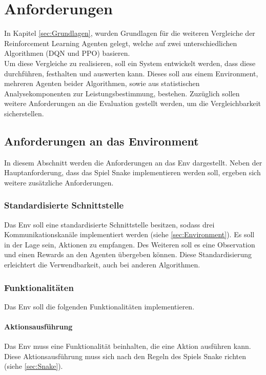 \chapter{Anforderungen} \label{chap:Anforderungen}
In Kapitel \ref{sec:Grundlagen}, wurden Grundlagen für die weiteren Vergleiche der Reinforcement Learning Agenten gelegt, welche auf zwei unterschiedlichen Algorithmen (DQN und PPO) basieren.\\
Um diese Vergleiche zu realisieren, soll ein System entwickelt werden, dass diese durchführen, festhalten und auswerten kann. Dieses soll aus einem Environment, mehreren Agenten beider Algorithmen, sowie aus statistischen Analysekomponenten zur Leistungsbestimmung, bestehen. Zuzüglich sollen weitere Anforderungen an die Evaluation gestellt werden, um die Vergleichbarkeit sicherstellen.

\section{Anforderungen an das Environment} \label{sec:Anforderungen_Env}
In diesem Abschnitt werden die Anforderungen an das Env dargestellt. Neben der Hauptanforderung, dass das Spiel Snake implementieren werden soll, ergeben sich weitere zusätzliche Anforderungen.

\subsection{Standardisierte Schnittstelle} \label{sec:Anforderungen_Schnittstelle}
Das Env soll eine standardisierte Schnittstelle besitzen, sodass drei Kommunikationskanäle implementiert werden (siehe \ref{sec:Environment}). Es soll in der Lage sein, Aktionen zu empfangen. Des Weiteren soll es eine Observation und einen Rewards an den Agenten übergeben können. Diese Standardisierung erleichtert die Verwendbarkeit, auch bei anderen Algorithmen.

\subsection{Funktionalitäten} \label{sec:Anforderungen_funktionalität_Env}
Das Env soll die folgenden Funktionalitäten implementieren.

\subsubsection{Aktionsausführung}
Das Env muss eine Funktionalität beinhalten, die eine Aktion ausführen kann. Diese Aktionsausführung muss sich nach den Regeln des Spiels Snake richten (siehe \ref{sec:Snake}).


